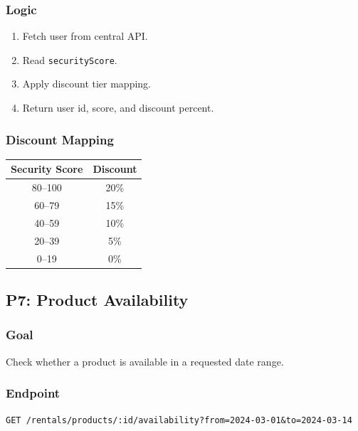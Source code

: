\documentclass[11pt,a4paper]{article}
\begin{document}
\subsubsection*{Logic}

\begin{enumerate}
  \item Fetch user from central API.
  \item Read \texttt{securityScore}.
  \item Apply discount tier mapping.
  \item Return user id, score, and discount percent.
\end{enumerate}

\subsubsection*{Discount Mapping}

\begin{center}
\begin{tabular}{|c|c|}
\hline
\textbf{Security Score} & \textbf{Discount} \\
\hline
80--100 & 20\% \\
\hline
60--79 & 15\% \\
\hline
40--59 & 10\% \\
\hline
20--39 & 5\% \\
\hline
0--19 & 0\% \\
\hline
\end{tabular}
\end{center}

\subsection{P7: Product Availability}

\subsubsection*{Goal}
Check whether a product is available in a requested date range.

\subsubsection*{Endpoint}

\begin{lstlisting}
GET /rentals/products/:id/availability?from=2024-03-01&to=2024-03-14
\end{lstlisting}
\end{document}
